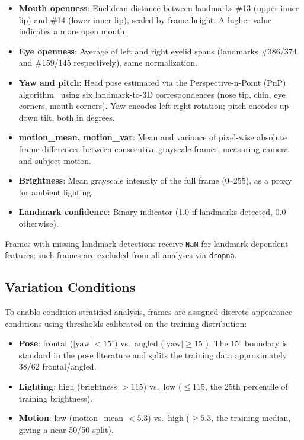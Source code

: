 \documentclass[conference]{IEEEtran}
\begin{document}
\begin{itemize}
  \item \textbf{Mouth openness}: Euclidean distance between landmarks \#13
        (upper inner lip) and \#14 (lower inner lip), scaled by frame height.
        A higher value indicates a more open mouth.

  \item \textbf{Eye openness}: Average of left and right eyelid spans
        (landmarks \#386/374 and \#159/145 respectively), same normalization.

  \item \textbf{Yaw and pitch}: Head pose estimated via the Perspective-n-Point
        (PnP) algorithm~\cite{opencv} using six landmark-to-3D correspondences
        (nose tip, chin, eye corners, mouth corners).
        Yaw encodes left-right rotation; pitch encodes up-down tilt, both in degrees.

  \item \textbf{motion\_mean, motion\_var}: Mean and variance of pixel-wise absolute
        frame differences between consecutive grayscale frames, measuring camera
        and subject motion.

  \item \textbf{Brightness}: Mean grayscale intensity of the full frame (0--255),
        as a proxy for ambient lighting.

  \item \textbf{Landmark confidence}: Binary indicator (1.0 if landmarks detected,
        0.0 otherwise).
\end{itemize}

Frames with missing landmark detections receive \texttt{NaN} for landmark-dependent
features; such frames are excluded from all analyses via \texttt{dropna}.

\subsection{Variation Conditions}

To enable condition-stratified analysis, frames are assigned discrete appearance
conditions using thresholds calibrated on the training distribution:

\begin{itemize}
  \item \textbf{Pose}: frontal ($|\text{yaw}| < 15^\circ$)
        vs.\ angled ($|\text{yaw}| \geq 15^\circ$).
        The $15^\circ$ boundary is standard in the pose literature and
        splits the training data approximately 38/62 frontal/angled.

  \item \textbf{Lighting}: high (brightness $> 115$)
        vs.\ low ($\leq 115$, the 25th percentile of training brightness).

  \item \textbf{Motion}: low (motion\_mean $< 5.3$)
        vs.\ high ($\geq 5.3$, the training median, giving a near 50/50 split).
\end{itemize}
\end{document}
